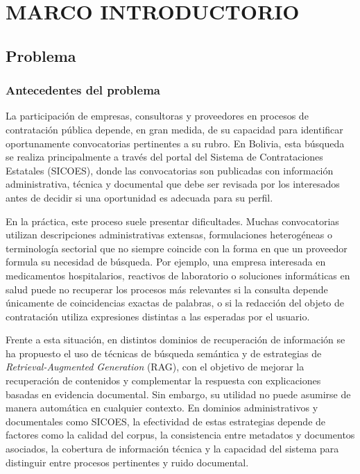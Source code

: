 \newpage
\chapter{MARCO INTRODUCTORIO}

\section{Problema}

\subsection{Antecedentes del problema}

La participación de empresas, consultoras y proveedores en procesos de contratación pública depende, en gran medida, de su capacidad para identificar oportunamente convocatorias pertinentes a su rubro. En Bolivia, esta búsqueda se realiza principalmente a través del portal del Sistema de Contrataciones Estatales (SICOES), donde las convocatorias son publicadas con información administrativa, técnica y documental que debe ser revisada por los interesados antes de decidir si una oportunidad es adecuada para su perfil.

En la práctica, este proceso suele presentar dificultades. Muchas convocatorias utilizan descripciones administrativas extensas, formulaciones heterogéneas o terminología sectorial que no siempre coincide con la forma en que un proveedor formula su necesidad de búsqueda. Por ejemplo, una empresa interesada en medicamentos hospitalarios, reactivos de laboratorio o soluciones informáticas en salud puede no recuperar los procesos más relevantes si la consulta depende únicamente de coincidencias exactas de palabras, o si la redacción del objeto de contratación utiliza expresiones distintas a las esperadas por el usuario.

Frente a esta situación, en distintos dominios de recuperación de información se ha propuesto el uso de técnicas de búsqueda semántica y de estrategias de \textit{Retrieval-Augmented Generation} (RAG), con el objetivo de mejorar la recuperación de contenidos y complementar la respuesta con explicaciones basadas en evidencia documental. Sin embargo, su utilidad no puede asumirse de manera automática en cualquier contexto. En dominios administrativos y documentales como SICOES, la efectividad de estas estrategias depende de factores como la calidad del corpus, la consistencia entre metadatos y documentos asociados, la cobertura de información técnica y la capacidad del sistema para distinguir entre procesos pertinentes y ruido documental.

